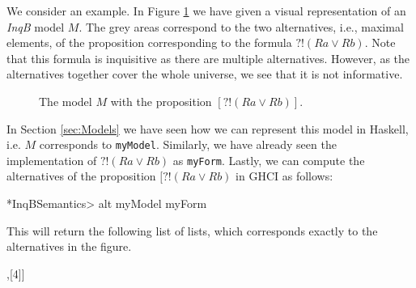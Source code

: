 We consider an example. In Figure \ref{fig:Example Model} we have given a visual representation of an \textit{InqB} model $M$. The grey areas correspond to the two alternatives, i.e., maximal elements, of the proposition corresponding to the formula $?!(Ra \lor Rb)$. Note that this formula is inquisitive as there are multiple alternatives. However, as the alternatives together cover the whole universe, we see that it is not informative.

\begin{figure}[ht]
    \centering
    \caption{The model $M$ with the proposition $[?!(Ra \lor Rb)]$.}
    \label{fig:Example Model}
\end{figure}

\noindent In Section \ref{sec:Models} we have seen how we can represent this model in Haskell, i.e. $M$ corresponds to \verb|myModel|. Similarly, we have already seen the implementation of $?!(Ra \lor Rb)$ as \verb|myForm|. Lastly, we can compute the alternatives of the proposition $[?!(Ra \lor Rb)$ in GHCI as follows:
\begin{showCode}
*InqBSemantics> alt myModel myForm
\end{showCode}
\noindent This will return the following list of lists, which corresponds exactly to the alternatives in the figure.
\begin{showCode}
[[1,2,3],[4]]
\end{showCode}
